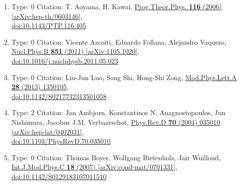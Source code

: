 \documentclass[a4paper,10pt]{article}
\begin{document}
\begin{enumerate}
\begin{enumerate}
  \item Type: 0 Citation: T. Aoyama, H. Kawai, \href{https://www.doi.org/10.1143/PTP.116.405}{Prog.Theor.Phys. {\bf 116} (2006) }  \href{https://arxiv.org/abs/hep-th/0603146}{[arXiv:hep-th/0603146]},\\\href{https://www.doi.org/10.1143/PTP.116.405}{doi:10.1143/PTP.116.405}
  \item Type: 0 Citation: Vicente Azcoiti, Eduardo Follana, Alejandro Vaquero, \href{https://www.doi.org/10.1016/j.nuclphysb.2011.05.023}{Nucl.Phys.B {\bf 851} (2011) }  \href{https://arxiv.org/abs/1105.1020}{[arXiv:1105.1020]},\\\href{https://www.doi.org/10.1016/j.nuclphysb.2011.05.023}{doi:10.1016/j.nuclphysb.2011.05.023}
  \item Type: 0 Citation: Liu-Jun Luo, Song Shi, Hong-Shi Zong, \href{https://www.doi.org/10.1142/S0217732313501058}{Mod.Phys.Lett.A {\bf 28} (2013) 1350105},\\\href{https://www.doi.org/10.1142/S0217732313501058}{doi:10.1142/S0217732313501058}
  \item Type: 2 Citation: Jan Ambjorn, Konstantinos N. Anagnostopoulos, Jun Nishimura, Jacobus J.M. Verbaarschot, \href{https://www.doi.org/10.1103/PhysRevD.70.035010}{Phys.Rev.D {\bf 70} (2004) 035010}  \href{https://arxiv.org/abs/hep-lat/0402031}{[arXiv:hep-lat/0402031]},\\\href{https://www.doi.org/10.1103/PhysRevD.70.035010}{doi:10.1103/PhysRevD.70.035010}
  \item Type: 0 Citation: Thomas Boyer, Wolfgang Bietenholz, Jair Wuilloud, \href{https://www.doi.org/10.1142/S0129183107011510}{Int.J.Mod.Phys.C {\bf 18} (2007) }  \href{https://arxiv.org/abs/cond-mat/0701331}{[arXiv:cond-mat/0701331]},\\\href{https://www.doi.org/10.1142/S0129183107011510}{doi:10.1142/S0129183107011510}

\end{enumerate}
\end{enumerate}
\end{document}
